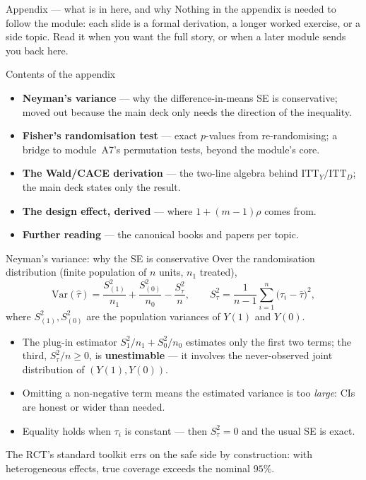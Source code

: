 \documentclass[aspectratio=169,11pt]{beamer}
\begin{document}
\begin{frame}{Appendix --- what is in here, and why}
  \small
  Nothing in the appendix is needed to follow the module: each slide is a formal
  derivation, a longer worked exercise, or a side topic. Read it when you want the full
  story, or when a later module sends you back here.
  \begin{block}{Contents of the appendix}
    \begin{itemize}
      \item \textbf{Neyman's variance} --- why the difference-in-means SE is
            conservative; moved out because the main deck only needs the direction of
            the inequality.
      \item \textbf{Fisher's randomisation test} --- exact $p$-values from re-randomising;
            a bridge to module~A7's permutation tests, beyond the module's core.
      \item \textbf{The Wald/CACE derivation} --- the two-line algebra behind
            $\mathrm{ITT}_Y/\mathrm{ITT}_D$; the main deck states only the result.
      \item \textbf{The design effect, derived} --- where $1+(m-1)\rho$ comes from.
      \item \textbf{Further reading} --- the canonical books and papers per topic.
    \end{itemize}
  \end{block}
\end{frame}

\begin{frame}{Neyman's variance: why the SE is conservative}
  \footnotesize
  Over the randomisation distribution (finite population of $n$ units, $n_1$ treated),
  \[
    \mathrm{Var}(\hat\tau)
      = \frac{S_{(1)}^2}{n_1} + \frac{S_{(0)}^2}{n_0} - \frac{S_{\tau}^2}{n},
    \qquad
    S_{\tau}^2 = \frac{1}{n-1}\sum_{i=1}^n\big(\tau_i - \bar\tau\big)^2 ,
  \]
  where $S_{(1)}^2, S_{(0)}^2$ are the population variances of $Y(1)$ and $Y(0)$.
  \begin{readme}
    \begin{itemize}
      \item The plug-in estimator $S_1^2/n_1 + S_0^2/n_0$ estimates only the first two
            terms; the third, $S_\tau^2/n \ge 0$, is \textbf{unestimable} --- it involves
            the never-observed joint distribution of $(Y(1),Y(0))$.
      \item Omitting a non-negative term means the estimated variance is too
            \emph{large}: CIs are honest or wider than needed.
      \item Equality holds when $\tau_i$ is constant --- then $S^2_\tau=0$ and the
            usual SE is exact.
    \end{itemize}
  \end{readme}
  \begin{takeaway}
    The RCT's standard toolkit errs on the safe side by construction: with heterogeneous
    effects, true coverage exceeds the nominal $95\%$.
  \end{takeaway}
\end{frame}
\end{document}
